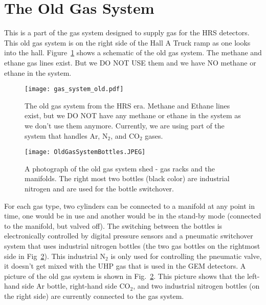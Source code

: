 \section{The Old Gas System}
 This is a part of the gas system designed to supply gas for the HRS detectors. This old gas system is on the right side of the Hall A Truck ramp as one looks into the hall.
Figure~\ref{fig:oldsystemschematic} shows a schematic of the old gas system. The methane and ethane gas lines exist.
 But we DO NOT USE them and we have NO methane or ethane in the system.
\begin{figure}[h!]
\begin{center}
\texttt{[image: gas\_system\_old.pdf]}
\caption{The old gas system from the HRS era. Methane and Ethane lines exist, but we DO NOT have any methane or ethane in the system as we don't use them anymore. Currently, we are using part of the system that handles Ar, N$_2$, and CO$_2$ gases.}
\label{fig:oldsystemschematic}
\end{center}
\end{figure}
\begin{figure}[h]
\begin{center}
\texttt{[image: OldGasSystemBottles.JPEG]}
\caption{A photograph of the old gas system shed - gas racks and the manifolds. The right most two bottles (black color) are industrial nitrogen and are used for the bottle switchover.}
\label{fig:BottleOS}
\end{center}
\end{figure}
 For each gas type, two cylinders can be connected to a manifold at any point in time, one would be
 in use and another would be in the stand-by mode (connected to the manifold, but valved off).
 The switching between the bottles is electronically controlled by digital pressure sensors and
 a pneumatic switchover system that uses industrial nitrogen bottles (the two gas bottles on the rightmost side in Fig~\ref{fig:BottleOS}).
 This industrial N$_2$ is only used for controlling the pneumatic valve, it doesn't get mixed with
 the UHP gas that is used in the GEM detectors. A picture of the old gas system is shown in Fig.~\ref{fig:BottleOS}.
 This picture shows that the left-hand side Ar bottle, right-hand side CO$_2$, and two industrial nitrogen bottles (on the right side) are currently connected to the gas system. 

